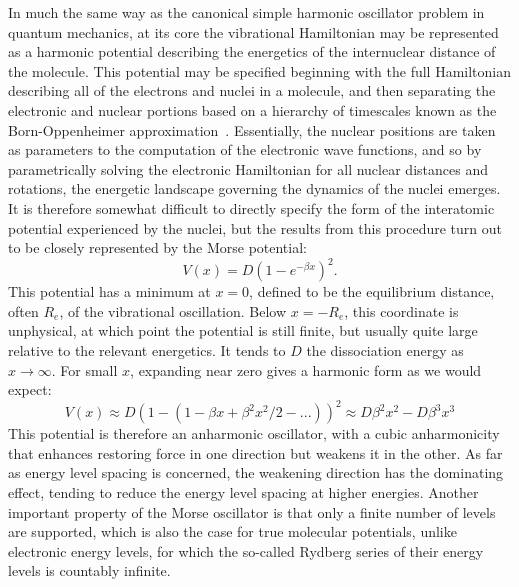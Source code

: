In much the same way as the canonical simple harmonic oscillator problem in quantum mechanics, at its core the vibrational Hamiltonian may be represented as a harmonic potential describing the energetics of the internuclear distance of the molecule.
This potential may be specified beginning with the full Hamiltonian describing all of the electrons and nuclei in a molecule, and then separating the electronic and nuclear portions based on a hierarchy of timescales known as the Born-Oppenheimer approximation~\citep[Sec.~8.1]{Atkins2005}.
Essentially, the nuclear positions are taken as parameters to the computation of the electronic wave functions, and so by parametrically solving the electronic Hamiltonian for all nuclear distances and rotations, the energetic landscape governing the dynamics of the nuclei emerges.
It is therefore somewhat difficult to directly specify the form of the interatomic potential experienced by the nuclei, but the results from this procedure turn out to be closely represented by the Morse potential:
\begin{equation}
V(x) = D\left(1-e^{-\beta x}\right)^2.\label{eqmorse}
\end{equation}
This potential has a minimum at $x=0$, defined to be the equilibrium distance, often $R_e$, of the vibrational oscillation. Below $x=-R_e$, this coordinate is unphysical, at which point the potential is still finite, but usually quite large relative to the relevant energetics. It tends to $D$ the dissociation energy as $x\rightarrow\infty$. For small $x$, expanding near zero gives a harmonic form as we would expect:
\begin{equation}
V(x) \approx D\left(1-(1-\beta x + \beta^2 x^2 / 2 - ...)\right)^2 \approx D\beta^2 x^2 - D\beta^3 x^3 
\end{equation}
This potential is therefore an anharmonic oscillator, with a cubic anharmonicity that enhances restoring force in one direction but weakens it in the other.
As far as energy level spacing is concerned, the weakening direction has the dominating effect, tending to reduce the energy level spacing at higher energies.
Another important property of the Morse oscillator is that only a finite number of levels are supported, which is also the case for true molecular potentials, unlike electronic energy levels, for which the so-called Rydberg series of their energy levels is countably infinite.

